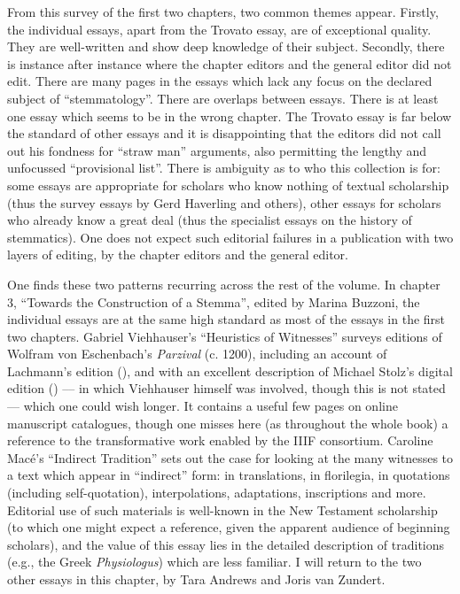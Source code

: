 \documentclass{article}
\begin{document}
From this survey of the first two chapters, two common themes
appear. Firstly, the individual essays, apart from the Trovato essay,
are of exceptional quality. They are well-written and show deep
knowledge of their subject. Secondly, there is instance after instance
where the chapter editors and the general editor did not edit. There are
many pages in the essays which lack any focus on the declared subject of
``stemmatology''. There are overlaps between essays. There is at least
one essay which seems to be in the wrong chapter. The Trovato essay is
far below the standard of other essays and it is disappointing that the
editors did not call out his fondness for ``straw man'' arguments, also
permitting the lengthy and unfocussed ``provisional list''. There is
ambiguity as to who this collection is for: some essays are appropriate
for scholars who know nothing of textual scholarship (thus the survey
essays by Gerd Haverling and others), other essays for scholars who
already know a great deal (thus the specialist essays on the history of
stemmatics). One does not expect such editorial failures in a
publication with two layers of editing, by the chapter editors and the
general editor.

One finds these two patterns recurring across the rest of the
volume. In chapter 3, ``Towards the Construction of a Stemma'', edited
by Marina Buzzoni, the individual essays are at the same high standard
as most of the essays in the first two chapters. Gabriel Viehhauser's
``Heuristics of Witnesses'' surveys editions of Wolfram von Eschenbach's
\emph{Parzival} (c. 1200), including an account of Lachmann's edition
(\citeyear{von_eschenbach_wolfram_1833}), and with an excellent description of Michael Stolz's digital
edition (\citeyear{von_eschenbach_parzival-projekt_2022}) –– in which Viehhauser himself was involved, though this
is not stated –– which one could wish longer. It contains a useful few
pages on online manuscript catalogues, though one misses here (as
throughout the whole book) a reference to the transformative work
enabled by the IIIF consortium. Caroline Macé's ``Indirect Tradition''
sets out the case for looking at the many witnesses to a text which
appear in ``indirect'' form: in translations, in florilegia, in
quotations (including self-quotation), interpolations, adaptations,
inscriptions and more. Editorial use of such materials is well-known in
the New Testament scholarship (to which one might expect a reference,
given the apparent audience of beginning scholars), and the value of
this essay lies in the detailed description of traditions (e.g., the
Greek \emph{Physiologus}) which are less familiar. I will return to the
two other essays in this chapter, by Tara Andrews and Joris van Zundert.
\end{document}
